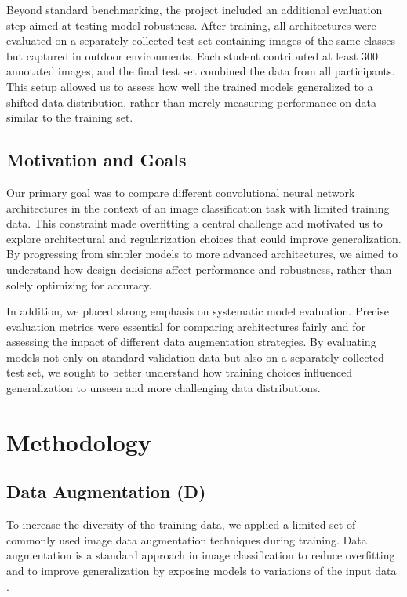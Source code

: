 \documentclass[a4paper]{article}
\begin{document}
Beyond standard benchmarking, the project included an additional evaluation step aimed at testing model robustness. After training, all architectures were evaluated on a separately collected test set containing images of the same classes but captured in outdoor environments. Each student contributed at least 300 annotated images, and the final test set combined the data from all participants. This setup allowed us to assess how well the trained models generalized to a shifted data distribution, rather than merely measuring performance on data similar to the training set.

\subsection{Motivation and Goals}
Our primary goal was to compare different convolutional neural network architectures in the context of an image classification task with limited training data. This constraint made overfitting a central challenge and motivated us to explore architectural and regularization choices that could improve generalization. By progressing from simpler models to more advanced architectures, we aimed to understand how design decisions affect performance and robustness, rather than solely optimizing for accuracy. 

In addition, we placed strong emphasis on systematic model evaluation. Precise evaluation metrics were essential for comparing architectures fairly and for assessing the impact of different data augmentation strategies. By evaluating models not only on standard validation data but also on a separately collected test set, we sought to better understand how training choices influenced generalization to unseen and more challenging data distributions.

\section{Methodology}

\subsection{Data Augmentation (D)}
To increase the diversity of the training data, we applied a limited set of commonly used image data augmentation techniques during training.
Data augmentation is a standard approach in image classification to reduce overfitting and to improve generalization by exposing models to variations of the input data \citep{shorten_survey_2019}.
\end{document}
